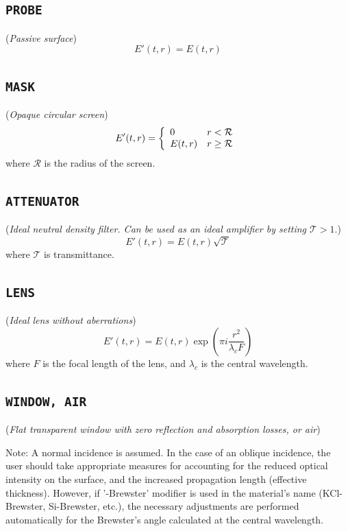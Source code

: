 \documentclass{report}
\begin{document}
\subsection*{\texttt{PROBE}}
(\textit{Passive surface})
\begin{equation}
E'(t,r) = E(t,r)
\end{equation}

\subsection*{\texttt{MASK}}
(\textit{Opaque circular screen})
\begin{equation}
E'(t,r) = \left\{ \begin{array}{ll}
  0         & r < \mathcal{R}\\
  E(t,r) & r \geq \mathcal{R}\end{array}\right.\\ 
\end{equation}
where $\mathcal{R}$ is the radius of the screen.

\subsection*{\texttt{ATTENUATOR}}
(\textit{Ideal neutral density filter. Can be used as an ideal amplifier by setting $\mathcal{T}>1$}.)
\begin{equation}
E'(t,r) = E(t,r) \sqrt{\mathcal{T}}
\end{equation}
where $\mathcal{T}$ is transmittance.

\subsection*{\texttt{LENS}}
(\textit{Ideal lens without aberrations})
\begin{equation}
E'(t,r) = E(t,r) \exp\left( \pi i \frac{r^2}{\lambda_c F} \right)
\end{equation}
where $F$ is the focal length of the lens, and $\lambda_c$ is the central wavelength.

\subsection*{\texttt{WINDOW, AIR}}
(\textit{Flat transparent window with zero reflection and absorption losses, or air})

Note: A normal incidence is assumed. In the case of an oblique incidence, the user should take appropriate measures for accounting for the reduced optical intensity on the surface, and the increased propagation length (effective thickness). However, if '-Brewster' modifier is used in the material's name (KCl-Brewster, Si-Brewster, etc.), the necessary adjustments are performed automatically for the Brewster's angle calculated at the central wavelength.
\end{document}
